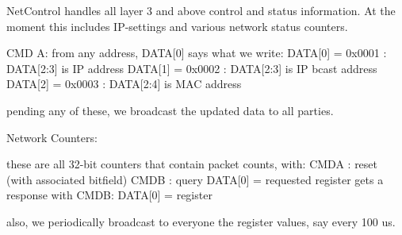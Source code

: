 NetControl handles all layer 3 and above control and status
information. At the moment this includes IP-settings and various
network status counters.

CMD A: from any address, DATA[0] says what we write:
    DATA[0] = 0x0001 : DATA[2:3] is IP address
    DATA[1] = 0x0002 : DATA[2:3] is IP bcast address
    DATA[2] = 0x0003 : DATA[2:4] is MAC address

pending any of these, we broadcast the updated data to all parties. 

Network Counters:

these are all 32-bit counters that contain packet counts, with: 
CMDA : reset (with associated bitfield)
CMDB : query DATA[0] = requested register
   gets a response with 
   CMDB: DATA[0] = register

   also, we periodically broadcast to everyone the register values,
   say every 100 us.

